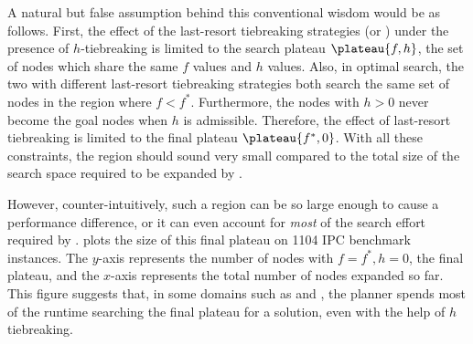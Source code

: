 

A natural but false assumption behind this conventional wisdom would be as follows.
% 
First, the effect of the last-resort tiebreaking strategies (\lifo or
\fifo) under the presence of $h$-tiebreaking is
limited to the search plateau $\plateau{f,h}$, the set of nodes which
share the same $f$ values and $h$ values.
% 
Also, in optimal search, the two \astar with
different last-resort tiebreaking strategies both search the same set of
nodes in the region where $f<f^*$.
% 
Furthermore, the nodes with $h>0$ never become the goal nodes when $h$ is admissible.
% 
Therefore, the effect of last-resort tiebreaking is limited to
the final plateau $\plateau{f^*,0}$.
% 
With all these constraints, the region should sound very small compared to the
total size of the search space required to be expanded by \astar.

However, counter-intuitively, such a region can be so large enough to
cause a performance difference, or it can even account for \emph{most} of the
search effort required by \astar.
 plots the size of this final plateau on 1104 IPC
benchmark instances.  The $y$-axis represents the number of nodes with
$f=f^*, h=0$, the final plateau, and the $x$-axis represents the total
number of nodes expanded so far. This figure suggests that, in some
domains such as  and , the planner
spends most of the runtime searching the final plateau for a solution,
even with the help of $h$ tiebreaking.

